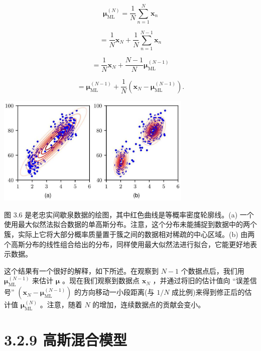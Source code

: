\documentclass[10pt]{article}
\begin{document}
\[
{\mathbf{\mu }}_{\mathrm{{ML}}}^{\left( N\right) } = \frac{1}{N}\mathop{\sum }\limits_{{n = 1}}^{N}{\mathbf{x}}_{n}
\]

\[
= \frac{1}{N}{\mathbf{x}}_{N} + \frac{1}{N}\mathop{\sum }\limits_{{n = 1}}^{{N - 1}}{\mathbf{x}}_{n}
\]

\[
= \frac{1}{N}{\mathbf{x}}_{N} + \frac{N - 1}{N}{\mathbf{\mu }}_{\mathrm{{ML}}}^{\left( N - 1\right) }
\]

\[
= {\mathbf{\mu }}_{\mathrm{{ML}}}^{\left( N - 1\right) } + \frac{1}{N}\left( {{\mathbf{x}}_{N} - {\mathbf{\mu }}_{\mathrm{{ML}}}^{\left( N - 1\right) }}\right) . \tag{3.110}
\]

\begin{center}
\includegraphics[max width=0.7\textwidth]{images/0194e279-9b28-703a-88f4-c3ac21e2010d_105_664_346_875_492_0.jpg}
\end{center}
\hspace*{3em} 

图 3.6 是老忠实间歇泉数据的绘图，其中红色曲线是等概率密度轮廓线。(a) 一个使用最大似然法拟合数据的单高斯分布。注意，这个分布未能捕捉到数据中的两个簇，实际上它将大部分概率质量置于簇之间的数据相对稀疏的中心区域。(b) 由两个高斯分布的线性组合给出的分布，同样使用最大似然法进行拟合，它能更好地表示数据。

这个结果有一个很好的解释，如下所述。在观察到 \(N - 1\) 个数据点后，我们用 \({\mathbf{\mu }}_{\mathrm{{ML}}}^{\left( N - 1\right) }\) 来估计 \(\mathbf{\mu }\) 。现在我们观察到数据点 \({\mathbf{x}}_{N}\) ，并通过将旧的估计值向 “误差信号” \(\left( {{\mathbf{x}}_{N} - {\mathbf{\mu }}_{\mathrm{{ML}}}^{\left( N - 1\right) }}\right)\) 的方向移动一小段距离(与 \(1/N\) 成比例)来得到修正后的估计值 \({\mathbf{\mu }}_{\mathrm{{ML}}}^{\left( N\right) }\) 。注意，随着 \(N\) 的增加，连续数据点的贡献会变小。

\section*{3.2.9 高斯混合模型}
\end{document}
